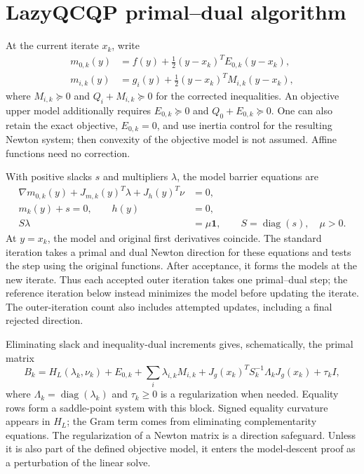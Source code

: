 \documentclass[pdflatex,sn-mathphys-num]{sn-jnl}
\theoremstyle{thmstyleone}
\theoremstyle{thmstylethree}
\newcounter{algorithm}
\newcommand{\diag}{\operatorname{diag}}
\begin{document}
\section{LazyQCQP primal--dual algorithm}\label{sec:algorithm}
At the current iterate $x_k$, write
\begin{align}
 m_{0,k}(y)&=f(y)+\tfrac12(y-x_k)^TE_{0,k}(y-x_k),\label{eq:m0}\\
 m_{i,k}(y)&=g_i(y)+\tfrac12(y-x_k)^TM_{i,k}(y-x_k),\label{eq:mi}
\end{align}
where $M_{i,k}\succeq0$ and $Q_i+M_{i,k}\succeq0$ for the corrected
inequalities. An objective upper model additionally requires
$E_{0,k}\succeq0$ and $Q_0+E_{0,k}\succeq0$. One can also
retain the exact objective, $E_{0,k}=0$, and use inertia control for the
resulting Newton system; then convexity of the objective model is not
assumed. Affine functions need no correction.

With positive slacks $s$ and multipliers $\lambda$, the model barrier
equations are
\begin{equation}\label{eq:barrier}
 \begin{aligned}
 \nabla m_{0,k}(y)+J_{m,k}(y)^T\lambda+J_h(y)^T\nu&=0,\\
 m_k(y)+s=0,\qquad h(y)&=0,\\
 S\lambda&=\mu\mathbf1,
 \qquad S=\diag(s),\quad\mu>0.
 \end{aligned}
\end{equation}
At $y=x_k$, the model and original first derivatives coincide. The
standard iteration takes a primal and dual Newton direction for these
equations and tests the step using the original functions. After acceptance,
it forms the models at the new iterate. Thus each accepted outer iteration
takes one primal--dual step; the reference iteration below instead minimizes
the model before updating the iterate. The outer-iteration count also includes
attempted updates, including a final rejected direction.

Eliminating slack and inequality-dual increments gives, schematically,
the primal matrix
\begin{equation}\label{eq:primal-block}
 B_k=H_L(\lambda_k,\nu_k)+E_{0,k}
 +\sum_i\lambda_{i,k}M_{i,k}
 +J_g(x_k)^TS_k^{-1}\Lambda_kJ_g(x_k)+\tau_k I,
\end{equation}
where $\Lambda_k=\diag(\lambda_k)$ and $\tau_k\geq0$ is a
regularization when needed. Equality rows form a saddle-point system with
this block. Signed equality curvature appears in $H_L$; the Gram term
comes from eliminating complementarity equations. The regularization of
a Newton matrix is a direction safeguard. Unless it is also part of the
defined objective model, it enters the
model-descent proof as a perturbation of the linear solve.
\end{document}
